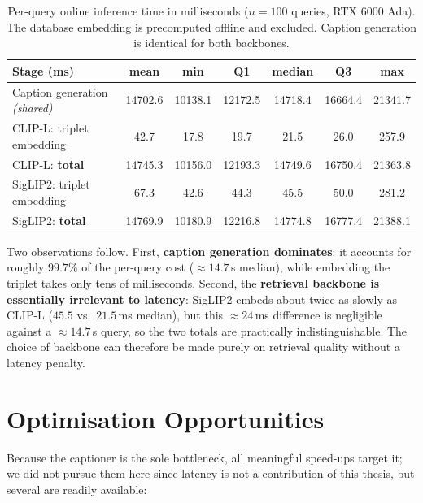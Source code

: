 \begin{table}[h!]
\centering
{}
\begin{tabular}{l S S S S S S}
\toprule
Stage (\si{\milli\second}) & {mean} & {min} & {Q1} & {median} & {Q3} & {max} \\
\midrule
Caption generation \emph{(shared)} & 14702.6 & 10138.1 & 12172.5 & 14718.4 & 16664.4 & 21341.7 \\
\midrule
CLIP-L: triplet embedding          &    42.7 &    17.8 &    19.7 &    21.5 &    26.0 &   257.9 \\
CLIP-L: \textbf{total}             & 14745.3 & 10156.0 & 12193.3 & 14749.6 & 16750.4 & 21363.8 \\
\midrule
SigLIP2: triplet embedding         &    67.3 &    42.6 &    44.3 &    45.5 &    50.0 &   281.2 \\
SigLIP2: \textbf{total}            & 14769.9 & 10180.9 & 12216.8 & 14774.8 & 16777.4 & 21388.1 \\
\bottomrule
\end{tabular}
\caption[Per-query online inference time (\emph{Ours}, $K{=}5$).]{Per-query
online inference time in milliseconds ($n{=}100$ queries, RTX 6000 Ada). The
database embedding is precomputed offline and excluded. Caption generation is
identical for both backbones.}
\label{tab:inference_time}
\end{table}

Two observations follow. First, \textbf{caption generation dominates}: it
accounts for roughly $99.7\%$ of the per-query cost ($\approx\!14.7$\,s median),
while embedding the triplet takes only tens of milliseconds. Second, the
\textbf{retrieval backbone is essentially irrelevant to latency}: SigLIP2 embeds
about twice as slowly as CLIP-L ($45.5$ vs.\ $21.5$\,\si{\milli\second} median),
but this $\approx\!24$\,\si{\milli\second} difference is negligible against a
$\approx\!14.7$\,s query, so the two totals are practically indistinguishable.
The choice of backbone can therefore be made purely on retrieval quality without
a latency penalty.

\section*{Optimisation Opportunities}

Because the captioner is the sole bottleneck, all meaningful speed-ups target it;
we did not pursue them here since latency is not a contribution of this thesis,
but several are readily available:


